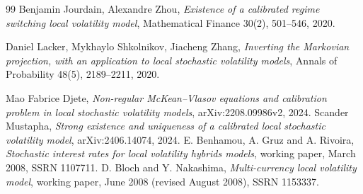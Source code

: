 \begin{thebibliography}{99}
  Benjamin Jourdain, Alexandre Zhou,
  \emph{Existence of a calibrated regime switching local volatility model},
  Mathematical Finance 30(2), 501--546, 2020.

  Daniel Lacker, Mykhaylo Shkolnikov, Jiacheng Zhang,
  \emph{Inverting the Markovian projection, with an application to local stochastic volatility models},
  Annals of Probability 48(5), 2189--2211, 2020.

Mao Fabrice Djete,
\emph{Non-regular McKean--Vlasov equations and calibration problem in local
stochastic volatility models}, arXiv:2208.09986v2, 2024.
Scander Mustapha,
\emph{Strong existence and uniqueness of a calibrated local stochastic
volatility model}, arXiv:2406.14074, 2024.
E. Benhamou, A. Gruz and A. Rivoira,
\emph{Stochastic interest rates for local volatility hybrids models}, working paper, March 2008, SSRN 1107711.
D. Bloch and Y. Nakashima,
\emph{Multi-currency local volatility model}, working paper, June 2008 (revised August 2008), SSRN 1153337.
\end{thebibliography}
